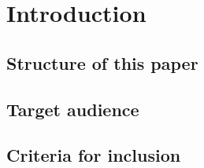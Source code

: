 \section{Introduction}
\blindtext[3]

\subsection{Structure of this paper}
\blindtext[3]

\subsection{Target audience}
\blindtext[3]

\subsection{Criteria for inclusion}
\blindtext[3]